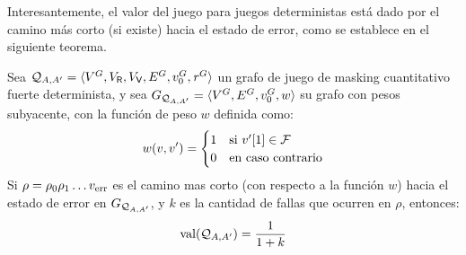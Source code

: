 Interesantemente, el valor del juego para juegos deterministas está dado por el camino más corto (si existe) hacia el estado de error, como se establece en el siguiente teorema.
\begin{theorem}\label{thm:det-games} Sea  $\QMStrGame = \langle V^G, V_\Refuter,V_\Verifier, E^G, \InitVertex^G, \reward^G \rangle$ un grafo de juego de masking cuantitativo fuerte determinista,
y sea  $G_{\QMStrGame} = \langle V^G,  E^G, \InitVertex^G, w \rangle$ su grafo con pesos subyacente, con la función de peso $w$ 
definida como:
\[
w(v, v') =
\begin{cases} 1 & \text{si $\pr{1}{v'} \in \Faults$} \\
		      0 & \text{en caso contrario}	 
\end{cases}
\]
	Si $\rho = \rho_0 \rho_1  \dots \ErrorSt$ es el camino mas corto (con respecto a la función $w$)
hacia el estado de error en $G_{\QMStrGame}$, y $k$ es la cantidad de fallas que ocurren en $\rho$, entonces: 
\[
	\val(\QMStrGame) = \frac{1}{1+k}
\]
\end{theorem}
